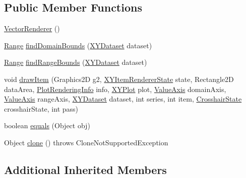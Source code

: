 \subsection*{Public Member Functions}
\begin{DoxyCompactItemize}
\item 
\mbox{\hyperlink{classorg_1_1jfree_1_1chart_1_1renderer_1_1xy_1_1_vector_renderer_aeea262d9e561b2aef809fc33a56767f9}{Vector\+Renderer}} ()
\item 
\mbox{\hyperlink{classorg_1_1jfree_1_1data_1_1_range}{Range}} \mbox{\hyperlink{classorg_1_1jfree_1_1chart_1_1renderer_1_1xy_1_1_vector_renderer_a05a8f9e4032e5aff9947ecb614ebfe82}{find\+Domain\+Bounds}} (\mbox{\hyperlink{interfaceorg_1_1jfree_1_1data_1_1xy_1_1_x_y_dataset}{X\+Y\+Dataset}} dataset)
\item 
\mbox{\hyperlink{classorg_1_1jfree_1_1data_1_1_range}{Range}} \mbox{\hyperlink{classorg_1_1jfree_1_1chart_1_1renderer_1_1xy_1_1_vector_renderer_a5e5c5df47a4d5b4dee4603bc04885995}{find\+Range\+Bounds}} (\mbox{\hyperlink{interfaceorg_1_1jfree_1_1data_1_1xy_1_1_x_y_dataset}{X\+Y\+Dataset}} dataset)
\item 
void \mbox{\hyperlink{classorg_1_1jfree_1_1chart_1_1renderer_1_1xy_1_1_vector_renderer_a24c7f526c9595d5c75b8cde59c64620a}{draw\+Item}} (Graphics2D g2, \mbox{\hyperlink{classorg_1_1jfree_1_1chart_1_1renderer_1_1xy_1_1_x_y_item_renderer_state}{X\+Y\+Item\+Renderer\+State}} state, Rectangle2D data\+Area, \mbox{\hyperlink{classorg_1_1jfree_1_1chart_1_1plot_1_1_plot_rendering_info}{Plot\+Rendering\+Info}} info, \mbox{\hyperlink{classorg_1_1jfree_1_1chart_1_1plot_1_1_x_y_plot}{X\+Y\+Plot}} plot, \mbox{\hyperlink{classorg_1_1jfree_1_1chart_1_1axis_1_1_value_axis}{Value\+Axis}} domain\+Axis, \mbox{\hyperlink{classorg_1_1jfree_1_1chart_1_1axis_1_1_value_axis}{Value\+Axis}} range\+Axis, \mbox{\hyperlink{interfaceorg_1_1jfree_1_1data_1_1xy_1_1_x_y_dataset}{X\+Y\+Dataset}} dataset, int series, int item, \mbox{\hyperlink{classorg_1_1jfree_1_1chart_1_1plot_1_1_crosshair_state}{Crosshair\+State}} crosshair\+State, int pass)
\item 
boolean \mbox{\hyperlink{classorg_1_1jfree_1_1chart_1_1renderer_1_1xy_1_1_vector_renderer_a3b0ed70aecb3d2d43d0b68ac565eacc5}{equals}} (Object obj)
\item 
Object \mbox{\hyperlink{classorg_1_1jfree_1_1chart_1_1renderer_1_1xy_1_1_vector_renderer_a8fd78969b04fa8047a84faabb569e113}{clone}} ()  throws Clone\+Not\+Supported\+Exception 
\end{DoxyCompactItemize}
\subsection*{Additional Inherited Members}


